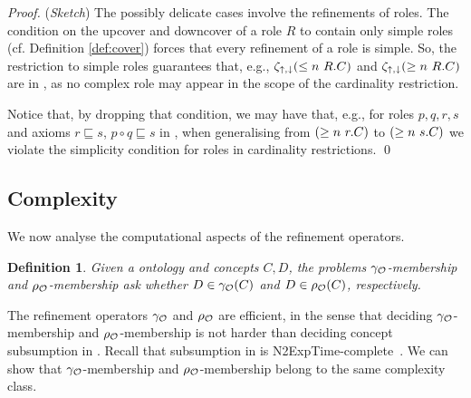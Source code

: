\documentclass[
]{ceurart}
\newtheorem{definition}{Definition}
\begin{document}
\begin{proof}(\emph{Sketch})  The possibly delicate cases involve the refinements of roles. The condition on the upcover and downcover of a role $R$ to contain only simple roles (cf. Definition \ref{def:cover}) forces that every refinement of a role is simple. 
So, the restriction to simple roles guarantees that, e.g., $\zeta_{\mathop{\uparrow},\mathop{\downarrow}}(\leq n~R. C)$ and $\zeta_{\mathop{\uparrow},\mathop{\downarrow}}(\geq n~R. C)$ are in \SROIQ, as no complex role may appear in the scope of the cardinality restriction.

Notice that, by dropping that condition, we may have that, e.g., for roles $p, q, r, s$ and axioms $r \sqsubseteq s$, $p \circ q \sqsubseteq s$ in \Ontology, when generalising from $(\geq n~r. C)$ to $(\geq n~s. C)$ we violate the simplicity condition for roles in cardinality restrictions.  
\qed\end{proof}


\subsection{Complexity}

We now analyse the computational aspects of the refinement operators.
\begin{definition}
Given a \SROIQ ontology \Ontology and concepts $C,D$,
the problems {\sc $\gamma_\mathcal{O}$-membership} and {\sc $\rho_\mathcal{O}$-membership} ask whether $D \in \gamma_\mathcal{O}(C)$ and $D \in \rho_\mathcal{O}(C)$, respectively.
\end{definition}
%
The refinement operators $\gamma_\mathcal{O}$ and $\rho_\mathcal{O}$ are efficient, in the sense that 
deciding {\sc $\gamma_\mathcal{O}$-membership} and {\sc $\rho_\mathcal{O}$\mbox{-}membership} is not harder than 
deciding concept subsumption in \SROIQ.
%
Recall that subsumption in \SROIQ is N2ExpTime-complete~\cite{DBLP:conf/kr/Kazakov08}.
%
We can show that {\sc $\gamma_\mathcal{O}$-membership} and {\sc $\rho_\mathcal{O}$-membership} belong to the same complexity class.
\end{document}
